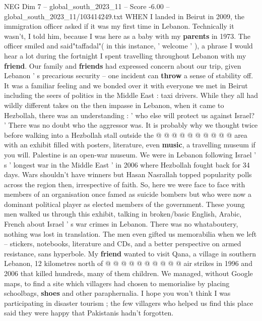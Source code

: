 \begin{textsample}{NEG Dim 7 – global\_south\_2023\_11 – Score -6.00 – global\_south\_2023\_11/103414249.txt}  \label{ex:f7_neg_330}
WHEN I landed in Beirut in 2009, the immigration officer asked if it was my first time in Lebanon.
Technically it wasn't, I told him, because I was here as a baby with my \textbf{parents} in 1973.
The officer smiled and said"taffadal"( in this instance, ' welcome ' ), a phrase I would hear a lot during the fortnight I spent travelling throughout Lebanon with my \textbf{friend}.
Our family and \textbf{friends} had expressed concern about our trip, given Lebanon ' s precarious security -- one incident can \textbf{throw} a sense of stability off.
It was a familiar feeling and we bonded over it with everyone we met in Beirut including the seers of politics in the Middle East : taxi drivers.
While they all had wildly different takes on the then impasse in Lebanon, when it came to Hezbollah, there was an understanding : ' who else will protect us against Israel? ' There was no doubt who the aggressor was.
It is probably why we thought twice before walking into a Hezbollah stall outside the @ @ @ @ @ @ @ @ @ @ area with an exhibit filled with posters, literature, even \textbf{music}, a travelling museum if you will.
Palestine is an open-war museum.
We were in Lebanon following Israel ' s ' longest war in the Middle East ' in 2006 where Hezbollah fought back for 34 days.
Wars shouldn't have winners but Hasan Nasrallah topped popularity polls across the region then, irrespective of faith.
So, here we were face to face with members of an organisation once famed as suicide bombers but who were now a dominant political player as elected members of the government.
These young men walked us through this exhibit, talking in broken/basic English, Arabic, French about Israel ' s war crimes in Lebanon.
There was no whataboutery, nothing was lost in translation.
The men even gifted us memorabilia when we left -- stickers, notebooks, literature and CDs, and a better perspective on armed resistance, sans hyperbole.
My \textbf{friend} wanted to visit Qana, a village in southern Lebanon, 12 kilometres north of @ @ @ @ @ @ @ @ @ @ air strikes in 1996 and 2006 that killed hundreds, many of them children.
We managed, without Google maps, to find a site which villagers had chosen to memorialise by placing schoolbags, \textbf{shoes} and other paraphernalia.
I hope you won't think I was participating in disaster tourism ; the few villagers who helped us find this place said they were happy that Pakistanis hadn't forgotten.

\end{textsample}
